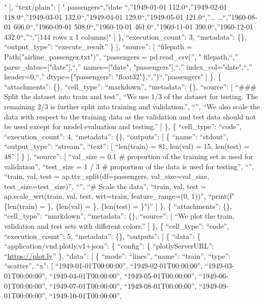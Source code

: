 \documentclass[
]{article}
\begin{document}
" {]}, ``text/plain'': {[} " passengers\n``,''date \n``,''1949-01-01
112.0\n``,''1949-02-01 118.0\n``,''1949-03-01 132.0\n``,''1949-04-01
129.0\n``,''1949-05-01 121.0\n``,''\ldots{} \ldots{}\n``,''1960-08-01
606.0\n``,''1960-09-01 508.0\n``,''1960-10-01 461.0\n``,''1960-11-01
390.0\n``,''1960-12-01 432.0\n``,''\n``,''{[}144 rows x 1 columns{]}"
{]} \}, ``execution\_count'': 3, ``metadata'': \{\}, ``output\_type'':
``execute\_result'' \} {]}, ``source'': {[} ``filepath =
Path("airline\_passenger.txt")\n'', ``passengers = pd.read\_csv(\n'', "
filepath,\n``,'' parse\_dates={[}"date"{]},\n``,'' names={[}"date",
"passengers"{]},\n``,'' index\_col="date",\n``,'' header=0,\n``,''
dtype=\{"passengers": "float32"\},\n``,'')\n``,''passengers" {]} \}, \{
``attachments'': \{\}, ``cell\_type'': ``markdown'', ``metadata'': \{\},
``source'': {[} ``\#\#\# Split the dataset into train and test\n'', ``We
use 1/3 of the dataset for testing. The remaining 2/3 is further split
into training and validation.\n'', ``\n'', ``We also scale the data with
respect to the training data as the validation and test data should not
be used except for model evaluation and testing.'' {]} \}, \{
``cell\_type'': ``code'', ``execution\_count'': 4, ``metadata'': \{\},
``outputs'': {[} \{ ``name'': ``stdout'', ``output\_type'': ``stream'',
``text'': {[} ``len(train) = 81, len(val) = 15, len(test) = 48\n'' {]}
\} {]}, ``source'': {[} ``val\_size = 0.1 \# proportion of the training
set is used for validation\n'', ``test\_size = 1 / 3 \# proportion of
the data is used for testing\n'', ``\n'', ``train, val, test =
ap.ttv\_split(df=passengers, val\_size=val\_size,
test\_size=test\_size)\n'', ``\n'', ``\# Scale the data\n'', ``train,
val, test = ap.scale\_wrt(train, val, test, wrt=train,
feature\_range=(0, 1))\n'', ``print(f"\{len(train) = \}, \{len(val) =
\}, \{len(test) = \}")\n'' {]} \}, \{ ``attachments'': \{\},
``cell\_type'': ``markdown'', ``metadata'': \{\}, ``source'': {[} ``We
plot the train, validation and test sets with different colors.'' {]}
\}, \{ ``cell\_type'': ``code'', ``execution\_count'': 5, ``metadata'':
\{\}, ``outputs'': {[} \{ ``data'': \{
``application/vnd.plotly.v1+json'': \{ ``config'': \{
``plotlyServerURL'': ``\url{https://plot.ly}'' \}, ``data'': {[} \{
``mode'': ``lines'', ``name'': ``train'', ``type'': ``scatter'', ``x'':
{[} ``1949-01-01T00:00:00'', ``1949-02-01T00:00:00'',
``1949-03-01T00:00:00'', ``1949-04-01T00:00:00'',
``1949-05-01T00:00:00'', ``1949-06-01T00:00:00'',
``1949-07-01T00:00:00'', ``1949-08-01T00:00:00'',
``1949-09-01T00:00:00'', ``1949-10-01T00:00:00'',
\end{document}

